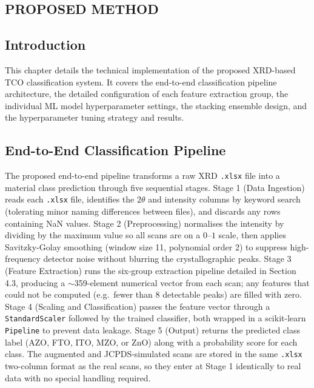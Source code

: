 \documentclass[12pt, oneside]{article} %
\begin{document}
\vfill \null

\newpage

\vfill \null
\thispagestyle{empty}
\begin{center}
\section{PROPOSED METHOD}
\end{center}
\vspace{2cm}


\subsection{Introduction}

This chapter details the technical implementation of the proposed XRD-based TCO classification system. It covers the end-to-end classification pipeline architecture, the detailed configuration of each feature extraction group, the individual ML model hyperparameter settings, the stacking ensemble design, and the hyperparameter tuning strategy and results.


\subsection{End-to-End Classification Pipeline}

The proposed end-to-end pipeline transforms a raw XRD \texttt{.xlsx} file into a material class prediction through five sequential stages. Stage 1 (Data Ingestion) reads each \texttt{.xlsx} file, identifies the $2\theta$ and intensity columns by keyword search (tolerating minor naming differences between files), and discards any rows containing NaN values. Stage 2 (Preprocessing) normalises the intensity by dividing by the maximum value so all scans are on a $0$--$1$ scale, then applies Savitzky-Golay smoothing (window size 11, polynomial order 2) to suppress high-frequency detector noise without blurring the crystallographic peaks. Stage 3 (Feature Extraction) runs the six-group extraction pipeline detailed in Section 4.3, producing a $\sim$359-element numerical vector from each scan; any features that could not be computed (e.g.\ fewer than 8 detectable peaks) are filled with zero. Stage 4 (Scaling and Classification) passes the feature vector through a \texttt{StandardScaler} followed by the trained classifier, both wrapped in a scikit-learn \texttt{Pipeline} to prevent data leakage. Stage 5 (Output) returns the predicted class label (AZO, FTO, ITO, MZO, or ZnO) along with a probability score for each class. The augmented and JCPDS-simulated scans are stored in the same \texttt{.xlsx} two-column format as the real scans, so they enter at Stage 1 identically to real data with no special handling required.
\end{document}
